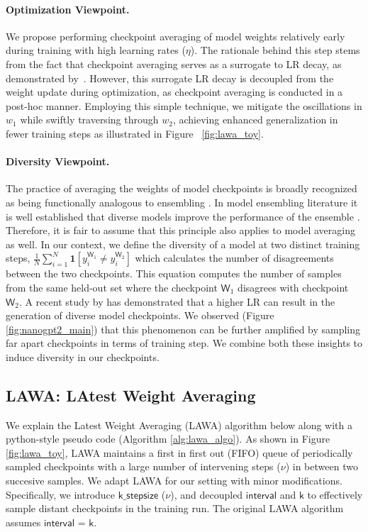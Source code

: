 \documentclass{article}
\newcommand{\method}{LAWA}
\begin{document}
\paragraph{Optimization Viewpoint.} We propose performing checkpoint averaging of model weights relatively early during training with high learning rates (\( \eta \)). The rationale behind this step stems from the fact that checkpoint averaging serves as a surrogate to LR decay, as demonstrated by~\citet{sandler2023training}. However, this surrogate LR decay is decoupled from the weight update during optimization, as checkpoint averaging is conducted in a post-hoc manner. Employing this simple technique, we mitigate the oscillations in \( w_{1} \) while swiftly traversing through \( w_{2} \), achieving enhanced generalization in fewer training steps as illustrated in Figure ~\ref{fig:lawa_toy}.

\paragraph{Diversity Viewpoint.} The practice of averaging the weights of model checkpoints is broadly recognized as being functionally analogous to ensembling \citep{SWA, model_soups}. In model ensembling literature it is well established that diverse models improve the performance of the ensemble \citep{lakshminarayanan2016simple}. Therefore, it is fair to assume that this principle also applies to model averaging as well. In our context, we define the diversity of a model at two distinct training steps, $\frac{1}{N} \sum_{i=1}^{N} \mathbf{1}\left[y_i^{\mathsf{W}_1} \neq y_i^{\mathsf{W}_2}\right]$ which calculates the number of disagreements between the two checkpoints. This equation computes the number of samples from the same held-out set where the checkpoint \(\mathsf{W}_1\) disagrees with checkpoint \(\mathsf{W}_2\). A recent study by \citeauthor{athiwaratkun2018many} has demonstrated that a higher LR can result in the generation of diverse model checkpoints. We observed (Figure \ref{fig:nanogpt2_main}) that this phenomenon can be further amplified by sampling far apart checkpoints in terms of training step. We combine both these insights to induce diversity in our checkpoints.

\subsection{LAWA: LAtest Weight Averaging}

We explain the Latest Weight Averaging (\method{}) algorithm below along with a python-style pseudo code (Algorithm \ref{alg:lawa_algo}). As shown in Figure \ref{fig:lawa_toy}, \method{} maintains a first in first out (FIFO) queue of periodically sampled checkpoints with a large number of intervening steps ($\nu$) in between two succesive samples. We adapt \method{} for our setting with minor modifications. Specifically, we introduce $\mathsf{k\_stepsize}$ ($\nu$), and decoupled $\mathsf{interval}$ and $\mathsf{k}$ to effectively sample distant checkpoints in the training run. The original LAWA algorithm \citep{lawa} assumes $\mathsf{interval}$ = $\mathsf{k}$.
\end{document}
